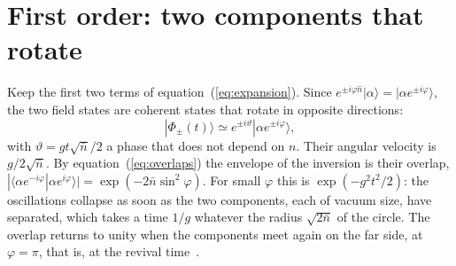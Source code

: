 \documentclass{iopjournal}
\newcommand{\nbar}{\bar{n}}
\newcommand{\ket}[1]{|#1\rangle}
\newcommand{\braket}[2]{\langle #1|#2\rangle}
\begin{document}
\section{First order: two components that rotate}
\label{sec:rotation}

Keep the first two terms of equation~(\ref{eq:expansion}). Since $e^{\pm i\varphi\hat{n}}\ket{\alpha} = \ket{\alpha e^{\pm i\varphi}}$, the two field states are coherent states that rotate in opposite directions:
\begin{equation}
\ket{\Phi_\pm(t)} \simeq e^{\pm i\vartheta}\ket{\alpha e^{\pm i\varphi}},
\label{eq:rotation}
\end{equation}
with $\vartheta = gt\sqrt{\nbar}/2$ a phase that does not depend on $n$. Their angular velocity is $g/2\sqrt{\nbar}$. By equation~(\ref{eq:overlaps}) the envelope of the inversion is their overlap, $|\braket{\alpha e^{-i\varphi}}{\alpha e^{i\varphi}}| = \exp(-2\nbar\sin^2\varphi)$. For small $\varphi$ this is $\exp(-g^2t^2/2)$: the oscillations collapse as soon as the two components, each of vacuum size, have separated, which takes a time $1/g$ whatever the radius $\sqrt{2\nbar}$ of the circle. The overlap returns to unity when the components meet again on the far side, at $\varphi = \pi$, that is, at the revival time~\cite{eberly1980, gea-banacloche1991}.
\end{document}
